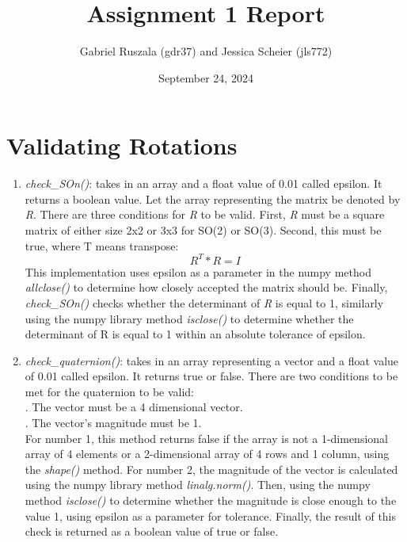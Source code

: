 \documentclass{article}
\title{Assignment 1 Report}
\author{Gabriel Ruszala (gdr37) and Jessica Scheier (jls772)}
\date{September 24, 2024}
\begin{document}
\maketitle

\section{Validating Rotations}
\begin{enumerate}
\item \textit{check\_SOn()}: takes in an array and a float value of 0.01 called epsilon. It returns a boolean value. Let the array representing the matrix be denoted by \textit{R}. There are three conditions for \textit{R} to be valid. First, \textit{R} must be a square matrix of either size 2x2 or 3x3 for SO(2) or SO(3). Second, this must be true, where T means transpose: 
\[R^T * R = I\]
This implementation uses epsilon as a parameter in the numpy method \textit{allclose()} to determine how closely accepted the matrix should be.
Finally, \textit{check\_SOn()} checks whether the determinant of \textit{R} is equal to 1, similarly using the numpy library method \textit{isclose()} to determine whether the determinant of R is equal to 1 within an absolute tolerance of epsilon.

\item \textit{check\_quaternion()}: takes in an array representing a vector and a float value of 0.01 called epsilon. It returns true or false. There are two conditions to be met for the quaternion to be valid:\\
. The vector must be a 4 dimensional vector.\\
. The vector's magnitude must be 1.\\
For number 1, this method returns false if the array is not a 1-dimensional array of 4 elements or a 2-dimensional array of 4 rows and 1 column, using the \textit{shape()} method. For number 2, the magnitude of the vector is calculated using the numpy library method \textit{linalg.norm()}. Then, using the numpy method \textit{isclose()} to determine whether the magnitude is close enough to the value 1, using epsilon as a parameter for tolerance. Finally, the result of this check is returned as a boolean value of true or false.


\end{enumerate}
\end{document}
